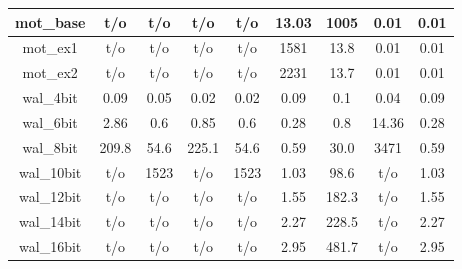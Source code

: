 \begin{table}[t]
\begin{tabular}{|c|c|c|c|c|c|c|c|c|}
mot\_base   & t/o       & t/o          & t/o        & t/o                  & 13.03     & 1005       & 0.01       & 0.01                 \\ \hline
mot\_ex1 & t/o       & t/o          & t/o        & t/o                  & 1581   & 13.8         & 0.01       & 0.01                 \\ \hline
mot\_ex2 & t/o       & t/o          & t/o        & t/o                  & 2231   & 13.7         & 0.01       & 0.01                 \\ \hline \hline
wal\_4bit  & 0.09      & 0.05         & 0.02       & 0.02                 & 0.09      & 0.1          & 0.04       & 0.09                 \\ \hline
wal\_6bit  & 2.86      & 0.6          & 0.85       & 0.6                  & 0.28      & 0.8          & 14.36      & 0.28                 \\ \hline
wal\_8bit  & 209.8    & 54.6         & 225.1     & 54.6                 & 0.59      & 30.0         & 3471    & 0.59                 \\ \hline
wal\_10bit & t/o       & 1523       & t/o        & 1523               & 1.03      & 98.6         & t/o        & 1.03                 \\ \hline
wal\_12bit & t/o       & t/o          & t/o        & t/o                  & 1.55      & 182.3        & t/o        & 1.55                 \\ \hline
wal\_14bit & t/o       & t/o          & t/o        & t/o                  & 2.27      & 228.5        & t/o        & 2.27                 \\ \hline
wal\_16bit & t/o       & t/o          & t/o        & t/o                  & 2.95      & 481.7        & t/o        & 2.95                 \\ \hline

\end{tabular}
\end{table} 
